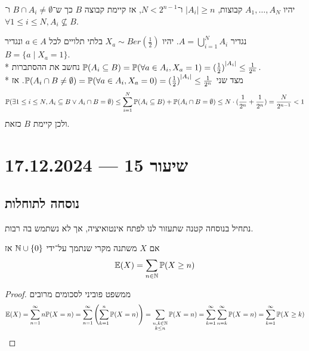 \begin{example}
	יהיו $A_1, \dots, A_N$ קבוצות, $|A_i| \ge n$ ו־$N < 2^{n - 1}$, אז קיימת קבוצה $B$ כך ש־$B \cap A_i \ne \emptyset$ ו־$\forall 1 \le i \le N, A_i \not\subseteq B$.

	נגדיר $A = \bigcup_{i = 1}^N A_i$.
	יהיו $X_a \sim Ber(\frac{1}{2})$ בלתי תלויים לכל $a \in A$ ונגדיר $B = \{ a \mid X_a = 1 \}$. \\*
	נחשב את ההסתברות $\mathbb{P}(A_i \subseteq B) = \mathbb{P}(\forall a \in A_i, X_a = 1) = {(\frac{1}{2})}^{|A_i|} \le \frac{1}{2^n}$. \\*
	מצד שני $\mathbb{P}(A_i \cap B \ne \emptyset) = \mathbb{P}(\forall a \in A_i, X_a = 0) = {(\frac{1}{2})}^{|A_i|} \le \frac{1}{2^n}$.
	אז
	\[
		\mathbb{P}(\exists 1 \le i \le N, A_i \subseteq B \lor A_i \cap B = \emptyset)
		\le \sum_{i = 1}^{N} \mathbb{P}(A_i \subseteq B) + \mathbb{P}(A_i \cap B = \emptyset)
		\le N \cdot (\frac{1}{2^n} + \frac{1}{2^n})
		= \frac{N}{2^{n - 1}}
		< 1
	\]
	ולכן קיימת $B$ כזאת.
\end{example}

\section{שיעור 15 --- 17.12.2024}

\subsection{נוסחה לתוחלות}
נתחיל בנוסחה קטנה שתעזור לנו לפתח אינטואיציה, אך לא נשתמש בה רבות.
\begin{proposition}
	אם $X$ משתנה מקרי שנתמך על־ידי $\mathbb{N} \cup \{0\}$ אז
	\[
		\mathbb{E}(X) = \sum_{n \in \mathbb{N}} \mathbb{P}(X \ge n)
	\]
\end{proposition}
\begin{proof}
	ממשפט פוביני לסכומים מרובים
	\[
		\mathbb{E}(X)
		= \sum_{n = 1}^\infty n \mathbb{P}(X = n)
		= \sum_{n = 1}^\infty \left( \sum_{k = 1}^n \mathbb{P}(X = n) \right)
		= \sum_{\substack{n, k \in \mathbb{N} \\ k \le n}} \mathbb{P}(X = n)
		= \sum_{k = 1}^\infty \sum_{n = k}^\infty \mathbb{P}(X = n)
		= \sum_{k = 1}^\infty \mathbb{P}(X \ge k)
	\]
\end{proof}


